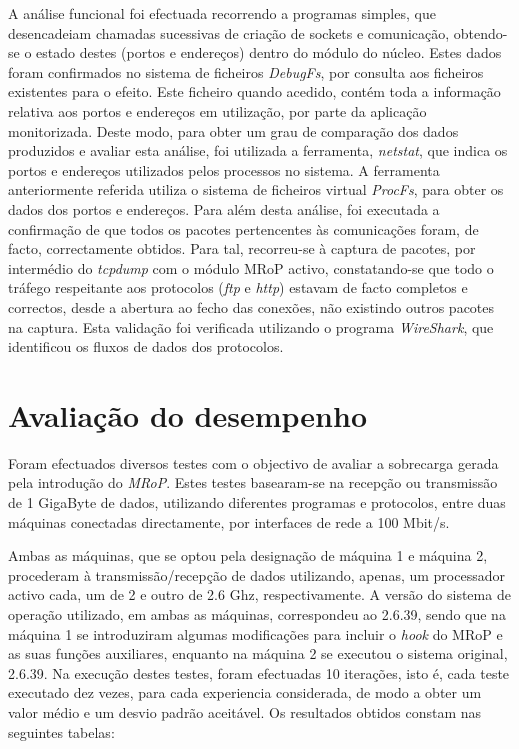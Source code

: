 A análise funcional foi efectuada recorrendo a programas simples, que desencadeiam chamadas sucessivas de criação de sockets e comunicação, obtendo-se o estado destes (portos e endereços) dentro do módulo do núcleo.
Estes dados foram confirmados no sistema de ficheiros \textit{DebugFs}, por consulta aos ficheiros existentes para o efeito.
Este ficheiro quando acedido, contém toda a informação relativa aos portos e endereços em utilização, por parte da aplicação monitorizada.
Deste modo, para obter um grau de comparação dos dados produzidos e avaliar esta análise, foi utilizada a ferramenta, \textit{netstat}, que indica os portos e endereços utilizados pelos processos no sistema.
A ferramenta anteriormente referida utiliza o sistema de ficheiros virtual \textit{ProcFs}, para obter os dados dos portos e endereços.
Para além desta análise, foi executada a confirmação de que todos os pacotes pertencentes às comunicações foram, de facto, correctamente obtidos.
Para tal, recorreu-se à captura de pacotes, por intermédio do \textit{tcpdump} com o módulo MRoP activo, constatando-se que todo o tráfego respeitante aos protocolos (\textit{ftp} e \textit{http}) estavam de facto completos e correctos, desde a abertura ao fecho das conexões, não existindo outros pacotes na captura.
Esta validação foi verificada utilizando o programa \textit{WireShark}, que identificou os fluxos de dados dos protocolos.


\section{Avaliação do desempenho}
\label{sec:eval_performance}


Foram efectuados diversos testes com o objectivo de avaliar a sobrecarga gerada pela introdução do \textit{MRoP}.
Estes testes basearam-se na recepção ou transmissão de 1 GigaByte de dados, utilizando diferentes programas e protocolos, entre duas máquinas conectadas directamente, por interfaces de rede a 100 Mbit/s.

Ambas as máquinas, que se optou pela designação de máquina 1 e máquina 2, procederam à transmissão/recepção de dados utilizando, apenas, um processador activo cada, um de 2 e outro de 2.6 Ghz, respectivamente.
A versão do sistema de operação utilizado, em ambas as máquinas, correspondeu ao 2.6.39, sendo que na máquina 1 se introduziram algumas modificações para incluir o \textit{hook} do MRoP e as suas funções auxiliares, enquanto na máquina 2 se executou o sistema original, 2.6.39.
Na execução destes testes, foram efectuadas 10 iterações, isto é, cada teste executado dez vezes, para cada experiencia considerada, de modo a obter um valor médio e um desvio padrão aceitável.
Os resultados obtidos constam nas seguintes tabelas:

